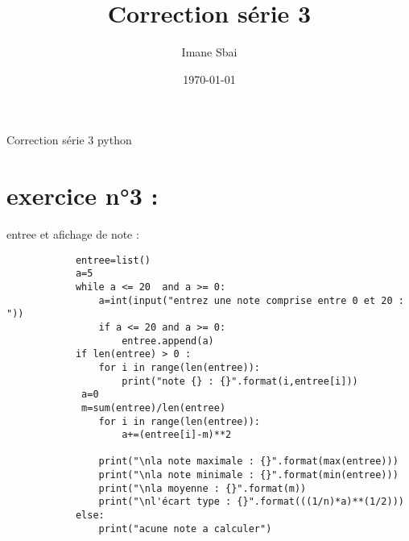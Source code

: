 \documentclass{article}
\title{Correction série 3}
\author{Imane Sbai}
\date {\today}
\begin{document}
\begin{titlepage}
    \begin{center}
Correction série 3 python
    \end{center}
\end{titlepage}

\section{exercice n°3 :}
        \begin{center}
    		entree et afichage de note :
		\end{center}    	  
        	
    	\begin{verbatim}
			entree=list()
			a=5
			while a <= 20  and a >= 0:
    			a=int(input("entrez une note comprise entre 0 et 20 : "))
    			if a <= 20 and a >= 0:
        			entree.append(a) 
			if len(entree) > 0 :
    			for i in range(len(entree)):
        			print("note {} : {}".format(i,entree[i]))
   			 a=0
   			 m=sum(entree)/len(entree)
    			for i in range(len(entree)):
        			a+=(entree[i]-m)**2
    
    			print("\nla note maximale : {}".format(max(entree)))
    			print("\nla note minimale : {}".format(min(entree)))
    			print("\nla moyenne : {}".format(m))
    			print("\nl'écart type : {}".format(((1/n)*a)**(1/2)))
			else:
    			print("acune note a calculer")
		\end{verbatim}
\end{document}
